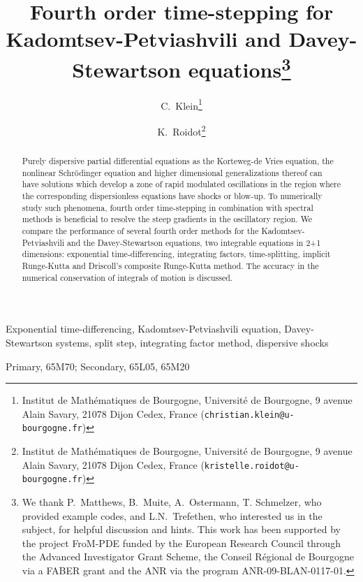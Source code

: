 \documentclass[final]{siamltex}
\title{Fourth order time-stepping for Kadomtsev-Petviashvili and 
Davey-Stewartson equations\thanks{We thank P.~Matthews, B.~Muite, 
A.~Ostermann, T. Schmelzer, who provided example codes, and
L.N.~Trefethen, who interested us in the subject,  
for helpful discussion and hints. This work has been supported by 
the project FroM-PDE funded by the European
Research Council through the Advanced Investigator Grant Scheme, 
the Conseil R\'egional de Bourgogne
via a FABER grant and the ANR via the program ANR-09-BLAN-0117-01.}}
\author{C.~Klein\thanks{Institut de Math\'ematiques de Bourgogne,
		Universit\'e de Bourgogne, 9 avenue Alain Savary, 21078 Dijon
		Cedex, France
    ({\tt christian.klein@u-bourgogne.fr})}
\and
K.~Roidot\thanks{Institut de Math\'ematiques de Bourgogne,
		Universit\'e de Bourgogne, 9 avenue Alain Savary, 21078 Dijon
		Cedex, France
    ({\tt kristelle.roidot@u-bourgogne.fr})}
}
\begin{document}
\maketitle

\begin{abstract}
    Purely dispersive partial differential 
       equations as the Korteweg-de Vries equation, the nonlinear 
	   Schr\"odinger equation and higher dimensional generalizations 
	   thereof	can have 
	   solutions 
	   which develop a zone of rapid modulated oscillations in 
	   the region where the corresponding dispersionless equations have 
	   shocks or blow-up. To numerically study such phenomena, fourth order time-stepping in combination 
	   with spectral methods is beneficial to 
	   resolve the steep gradients in the oscillatory 
	   region. We compare the performance of several fourth order 
	   methods for the Kadomtsev-Petviashvili  and the 
	   Davey-Stewartson equations, two integrable equations in 2+1 
	   dimensions:
	   exponential time-differencing, integrating factors, 
	   time-splitting, implicit Runge-Kutta and Driscoll's 
	   composite Runge-Kutta method. The 
	   accuracy in the numerical conservation of integrals of motion is discussed. 
\end{abstract}

\begin{keywords}
    Exponential time-differencing, Kadomtsev-Petviashvili equation,
    Davey-Stewartson systems, 
    split step, integrating factor method,  
    dispersive shocks
\end{keywords}

\begin{AMS}
    Primary, 65M70; Secondary, 65L05, 65M20
\end{AMS}
\end{document}
